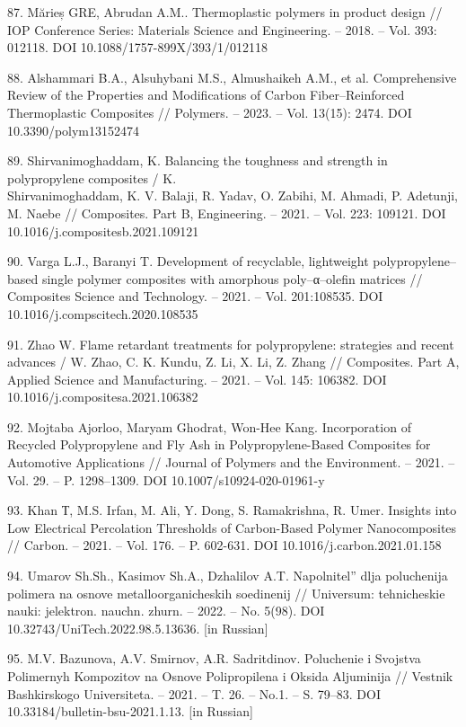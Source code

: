 \begin{references}
87. Mărieș GRE, Abrudan A.M.. Thermoplastic polymers in product design
// IOP Conference Series: Materials Science and Engineering. -- 2018. --
Vol. 393: 012118. DOI 10.1088/1757-899X/393/1/012118

88. Alshammari B.A., Alsuhybani M.S., Almushaikeh A.M., et al.
Comprehensive Review of the Properties and Modifications of Carbon
Fiber--Reinforced Thermoplastic Composites // Polymers. -- 2023. -- Vol.
13(15): 2474. DOI 10.3390/polym13152474

89. Shirvanimoghaddam, K. Balancing the toughness and strength in
polypropylene composites / K. \\Shirvanimoghaddam, K. V. Balaji, R. Yadav,
O. Zabihi, M. Ahmadi, P. Adetunji, M. Naebe // Composites. Part B,
Engineering. -- 2021. -- Vol. 223: 109121. DOI
10.1016/j.compositesb.2021.109121

90. Varga L.J., Baranyi T. Development of recyclable, lightweight
polypropylene--based single polymer composites with amorphous
poly--α--olefin matrices // Composites Science and Technology. -- 2021.
-- Vol. 201:108535. DOI 10.1016/j.compscitech.2020.108535

91. Zhao W. Flame retardant treatments for polypropylene: strategies and
recent advances / W. Zhao, C. K. Kundu, Z. Li, X. Li, Z. Zhang //
Composites. Part A, Applied Science and Manufacturing. -- 2021. -- Vol.
145: 106382. DOI 10.1016/j.compositesa.2021.106382

92. Mojtaba Ajorloo, Maryam Ghodrat, Won-Hee Kang. Incorporation of
Recycled Polypropylene and Fly Ash in Polypropylene-Based Composites for
Automotive Applications // Journal of Polymers and the Environment. --
2021. -- Vol. 29. -- P. 1298--1309. DOI 10.1007/s10924-020-01961-y

93. Khan Т, M.S. Irfan, M. Ali, Y. Dong, S. Ramakrishna, R. Umer.
Insights into Low Electrical Percolation Thresholds of Carbon-Based
Polymer Nanocomposites // Carbon. -- 2021. -- Vol. 176. -- P. 602-631.
DOI 10.1016/j.carbon.2021.01.158

94. Umarov Sh.Sh., Kasimov Sh.A., Dzhalilov A.T.
Napolnitel''{} dlja poluchenija polimera
na osnove metalloorganicheskih soedinenij // Universum: tehnicheskie
nauki: jelektron. nauchn. zhurn. -- 2022. -- No. 5(98). DOI
10.32743/UniTech.2022.98.5.13636. {[}in Russian{]}

95. M.V. Bazunova, A.V. Smirnov, A.R. Sadritdinov. Poluchenie i Svojstva
Polimernyh Kompozitov na Osnove Polipropilena i Oksida Aljuminija //
Vestnik Bashkirskogo Universiteta. -- 2021. -- T. 26. -- No.1. -- S.
79--83. DOI 10.33184/bulletin-bsu-2021.1.13. {[}in Russian{]}


\end{references}
